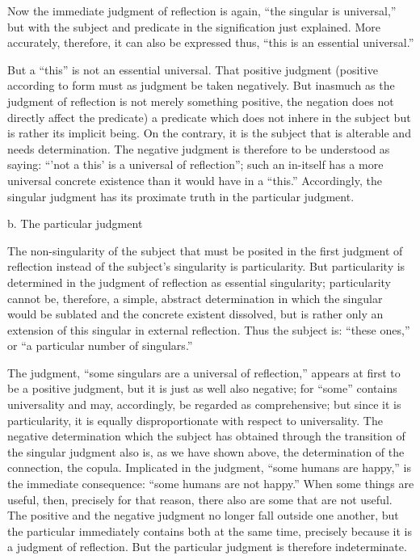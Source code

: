 Now the immediate judgment of reflection is again,
“the singular is universal,”
but with the subject and predicate
in the signification just explained.
More accurately, therefore,
it can also be expressed thus,
“this is an essential universal.”

But a “this” is not an essential universal.
That positive judgment
(positive according to form must
as judgment be taken negatively.
But inasmuch as the judgment of reflection is
not merely something positive,
the negation does not directly affect the predicate)
a predicate which does not inhere in the subject
but is rather its implicit being.
On the contrary, it is the subject
that is alterable and needs determination.
The negative judgment is therefore
to be understood as saying:
“'not a this' is a universal of reflection”;
such an in-itself has a more universal concrete existence
than it would have in a “this.”
Accordingly, the singular judgment has
its proximate truth in the particular judgment.

b. The particular judgment

The non-singularity of the subject
that must be posited in the first judgment of reflection
instead of the subject's singularity is particularity.
But particularity is determined in the judgment of reflection
as essential singularity;
particularity cannot be, therefore,
a simple, abstract determination
in which the singular would be sublated
and the concrete existent dissolved,
but is rather only an extension of
this singular in external reflection.
Thus the subject is: “these ones,”
or “a particular number of singulars.”

The judgment, “some singulars are a universal of reflection,”
appears at first to be a positive judgment,
but it is just as well also negative;
for “some” contains universality
and may, accordingly, be regarded as comprehensive;
but since it is particularity,
it is equally disproportionate
with respect to universality.
The negative determination which the subject has obtained
through the transition of the singular judgment also is,
as we have shown above, the determination
of the connection, the copula.
Implicated in the judgment,
“some humans are happy,”
is the immediate consequence:
“some humans are not happy.”
When some things are useful,
then, precisely for that reason,
there also are some that are not useful.
The positive and the negative judgment
no longer fall outside one another,
but the particular immediately contains both at the same time,
precisely because it is a judgment of reflection.
But the particular judgment is therefore indeterminate.

